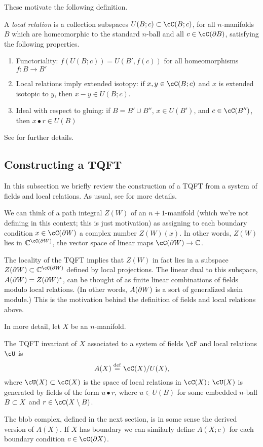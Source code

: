 These motivate the following definition.

\begin{defn}
A {\it local relation} is a collection subspaces $U(B; c) \sub \lf(B; c)$,
for all $n$-manifolds $B$ which are
homeomorphic to the standard $n$-ball and all $c \in \cC(\bd B)$, 
satisfying the following properties.
\begin{enumerate}
\item Functoriality: 
$f(U(B; c)) = U(B', f(c))$ for all homeomorphisms $f: B \to B'$
\item Local relations imply extended isotopy: 
if $x, y \in \cC(B; c)$ and $x$ is extended isotopic 
to $y$, then $x-y \in U(B; c)$.
\item Ideal with respect to gluing:
if $B = B' \cup B''$, $x\in U(B')$, and $c\in \cC(B'')$, then $x\bullet r \in U(B)$
\end{enumerate}
\end{defn}
See \cite{kw:tqft} for further details.


\subsection{Constructing a TQFT}
\label{sec:constructing-a-tqft}

In this subsection we briefly review the construction of a TQFT from a system of fields and local relations.
As usual, see \cite{kw:tqft} for more details.

We can think of a path integral $Z(W)$ of an $n+1$-manifold (which we're not defining in this context; this is just motivation) as assigning to each
boundary condition $x\in \cC(\bd W)$ a complex number $Z(W)(x)$.
In other words, $Z(W)$ lies in $\c^{\lf(\bd W)}$, the vector space of linear
maps $\lf(\bd W)\to \c$.

The locality of the TQFT implies that $Z(W)$ in fact lies in a subspace
$Z(\bd W) \sub \c^{\lf(\bd W)}$ defined by local projections.
The linear dual to this subspace, $A(\partial W) = Z(\partial W)^*$,
can be thought of as finite linear combinations of fields modulo local relations.
(In other words, $A(\partial W)$ is a sort of generalized skein module.)
This is the motivation behind the definition of fields and local relations above.

In more detail, let $X$ be an $n$-manifold.
\begin{defn}
\label{defn:TQFT-invariant}
The TQFT invariant of $X$ associated to a system of fields $\cF$ and local relations $\cU$ is 
	$$A(X) \deq \lf(X) / U(X),$$
where $\cU(X) \sub \lf(X)$ is the space of local relations in $\lf(X)$:
$\cU(X)$ is generated by fields of the form $u\bullet r$, where
$u\in U(B)$ for some embedded $n$-ball $B\subset X$ and $r\in \cC(X\setmin B)$.
\end{defn}
The blob complex, defined in the next section, 
is in some sense the derived version of $A(X)$.
If $X$ has boundary we can similarly define $A(X; c)$ for each 
boundary condition $c\in\cC(\bd X)$.

